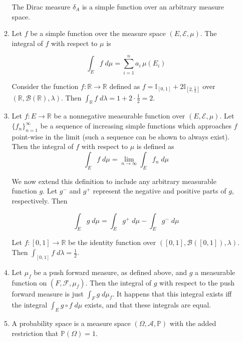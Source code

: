 \documentclass[pstricks, 11pt,a4paper]{article}
\theoremstyle{theorem}
\begin{document}
\begin{enumerate}
\begin{enumerate}
                The Dirac measure $\delta_{A}$ is a simple function over an arbitrary measure space.

          \item Let $f$ be a simple function over the measure space $(E, \mathcal{E}, \mu)$. The integral of $f$ with respect to $\mu$ is

                \[
                \int_{E}f\;d\mu = \sum_{i=1}^{n}a_{i}\,\mu(E_{i})
                \]

                Consider the function $f: \mathbb{R}\rightarrow\mathbb{R}$ defined as $f = \mathbb{I}_{[0, 1]} + 2\mathbb{I}_{[2, \frac{5}{2}]}$ over $(\mathbb{R}, \mathcal{B}(\mathbb{R}), \lambda)$. Then $\int_{\mathbb{R}}f \;d\lambda = 1 + 2 \cdot \frac{1}{2} = 2$.
          \item Let $f: E \rightarrow \mathbb{R}$ be a nonnegative measurable function over $(E, \mathcal{E}, \mu)$. Let $\{f_{n}\}_{n=1}^{\infty}$ be a sequence of increasing simple functions which approaches $f$ point-wise in the limit (such a sequence can be shown to always exist). Then the integral of $f$ with respect to $\mu$ is defined as
                \[
                \int_{E}f \;d\mu =\lim_{n\rightarrow\infty} \int_{E}f_{n}\;d\mu
                \]

                We now extend this definition to include any arbitrary measurable function $g$. Let $g^{-}$ and $g^{+}$ represent the negative and positive parts of $g$, respectively. Then

                \[
\int_{E}g\;d\mu = \int_{E}g^{+}\;d\mu - \int_{E}g^{-}\;d\mu
                \]

                Let $f: [0, 1]\rightarrow\mathbb{R}$ be the identity function over $([0, 1], \mathcal{B}([0, 1]), \lambda)$. Then $\int_{[0, 1]} f\; d\lambda = \frac{1}{2}$.

          \item Let $\mu_{f}$ be a push forward measure, as defined above, and $g$ a measurable function on $(F, \mathcal{F}, \mu_{f})$. Then the integral of $g$ with respect to the push forward measure is just $\int_{F}g\;d\mu_{f}$. It happens that this integral exists iff the integral $\int_E g \circ f\;d\mu$ exists, and that these integrals are equal.

          \item %
                A probability space is a measure space $(\Omega, \mathcal{A}, \mathbb{P})$ with the added restriction that $\mathbb{P}(\Omega) = 1$.


\end{enumerate}
\end{enumerate}
\end{document}
